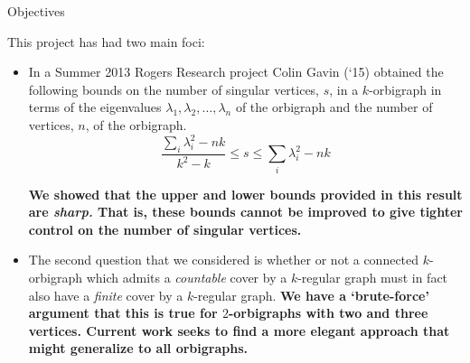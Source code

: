 \documentclass[final]{beamer}
\newlength{\onecolwid}
\newlength{\twocolwid}
\begin{document}
\begin{frame}[t]
\begin{columns}[t]
\begin{column}{\twocolwid}
\begin{columns}[t,totalwidth=\twocolwid]
\end{columns} %


\begin{alertblock}{Objectives}

This project has had two main foci:
\begin{itemize}
\item In a Summer 2013 Rogers Research project Colin Gavin (`15) obtained the following bounds on the number of singular vertices, $s$, in a $k$-orbigraph in terms of the eigenvalues $\lambda_1, \lambda_2, \dots, \lambda_n$ of the orbigraph and the number of vertices, $n$, of the orbigraph.
 $$
        \frac{\sum_{i} \lambda_i^2 - n k}{k^2 - k} \le s \le \sum_{i} \lambda_i^2 - n k
      $$
 
{\bf We showed that the upper and lower bounds provided in this result are \emph{sharp.}  That is, these bounds cannot be improved to give tighter control on the number of singular vertices.}
\medskip
\item The second question that we considered is whether or not a connected $k$-orbigraph which admits a \emph{countable} cover by a $k$-regular graph must in fact also have a \emph{finite} cover by a $k$-regular graph.  {\bf We have a `brute-force' argument that this is true for $2$-orbigraphs with two and three vertices.  Current work seeks to find a more elegant approach that might generalize to all orbigraphs.}
\end{itemize}

\end{alertblock} 


\begin{columns}[t,totalwidth=\twocolwid] %

\begin{column}{\onecolwid} %



\end{column}
\end{columns}
\end{column}
\end{columns}
\end{frame}
\end{document}
